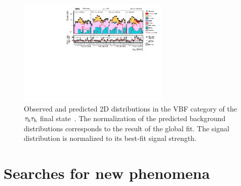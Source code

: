 \documentclass[10pt]{article}
\begin{document}
\begin{figure}[htb]
\centering
\includegraphics[height=2in]{figures/CMS-HIG-16-043__Figure_013__tauhtauh-VBF.pdf}
\caption{
  Observed and predicted 2D distributions in the VBF category of the
  $\tau_{\rm h}\tau_{\rm h}$ final state~\cite{Sirunyan:2017khh}. The normalization
  of the predicted background distributions corresponds to the result of the
  global fit. The signal distribution is normalized to its best-fit signal
  strength.
}
\label{fig:tauhtauh_VBF}
\end{figure}


\section{Searches for new phenomena}
\end{document}

